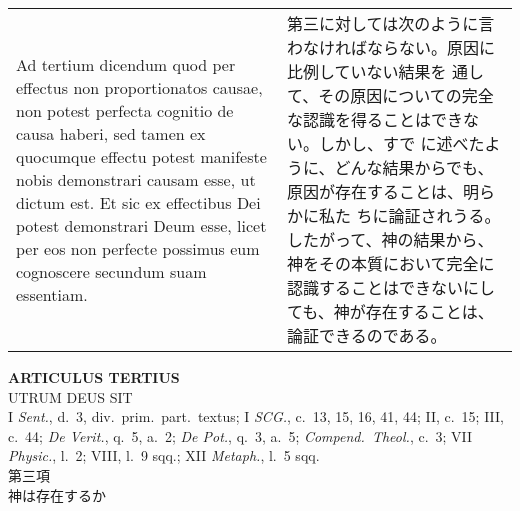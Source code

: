 \documentclass[10pt]{jsarticle} %
\begin{document}
\begin{longtable}{p{21em}p{21em}}
\\



{\sc Ad tertium dicendum} quod per effectus non
 proportionatos causae, non potest perfecta cognitio de causa haberi,
 sed tamen ex quocumque effectu potest manifeste nobis demonstrari
 causam esse, ut dictum est. Et sic ex effectibus Dei potest demonstrari
 Deum esse, licet per eos non perfecte possimus eum cognoscere secundum
 suam essentiam.

&


第三に対しては次のように言わなければならない。原因に比例していない結果を
 通して、その原因についての完全な認識を得ることはできない。しかし、すで
 に述べたように、どんな結果からでも、原因が存在することは、明らかに私た
 ちに論証されうる。したがって、神の結果から、神をその本質において完全に
 認識することはできないにしても、神が存在することは、論証できるのである。



\end{longtable}

\newpage
{}
\begin{center}
 {\Large {\bf ARTICULUS TERTIUS}}\\
 {\large UTRUM DEUS SIT}\\
 {\footnotesize I {\it Sent.}, d.~3, div.~prim.~part.~textus; I {\it
 SCG.}, c.~13, 15, 16, 41, 44; II, c.~15; III, c.~44; {\it De Verit.},
 q.~5, a.~2; {\it De Pot.}, q.~3, a.~5; {\it Compend.~Theol.}, c.~3; VII
 {\it Physic.}, l.~2; VIII, l.~9 sqq.; XII {\it Metaph.}, l.~5 sqq.}\\
 {\Large 第三項\\神は存在するか}
\end{center}
\end{document}
